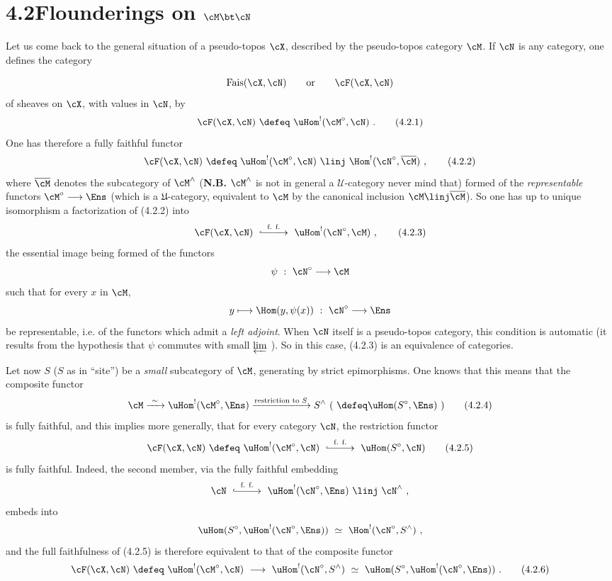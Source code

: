\section*{4.2\quad Flounderings on $\cM \bt \cN$}

Let us come back to the general situation of a pseudo-topos $\cX$, described by the pseudo-topos category $\cM$. If $\cN$ is any category, one defines the category

\[
\mathrm{Fais}(\cX,\cN) \qquad \text{or} \qquad \cF(\cX,\cN)
\]
of sheaves on $\cX$, with values in $\cN$, by
\[
\cF(\cX,\cN) \ \defeq\ \uHom^{!}(\cM^{\circ},\cN) \ .
\tag*{(4.2.1)}
\]
One has therefore a fully faithful functor
\[
\cF(\cX,\cN) \ \defeq\ \uHom^{!}(\cM^{\circ},\cN) \ \linj\ \Hom^{!}(\cN^{\circ},\overline{\cM}) \ ,
\tag*{(4.2.2)}
\]
where $\overline{\cM}$ denotes the subcategory of $\cM^{\wedge}$ (\textbf{N.B.} $\cM^{\wedge}$ is not in general a $\mathcal{U}$-category never mind that) formed of the \textit{representable} functors $\cM^{\circ}\longrightarrow\Ens$ (which is a $\mathfrak{U}$-category, equivalent to $\cM$ by the canonical inclusion $\cM \linj \overline{\cM}$). So one has up to unique isomorphism a factorization of (4.2.2) into
\[
\cF(\cX,\cN) \ \overset{\text{f. f.}}{\lhook\joinrel\relbar\joinrel\relbar\joinrel\longrightarrow}\ \uHom^{!}(\cN^{\circ},\cM) \ ,
\tag*{(4.2.3)}
\]
the essential image being formed of the functors
\[
\psi \ :\ \cN^{\circ} \longrightarrow \cM
\]
such that for every $x$ in $\cM$,
\[
y \longmapsto \Hom(y,\psi(x)) \ :\ \cN^{\circ} \longrightarrow \Ens
\]
be representable, i.e. of the functors which
admit a \textit{left adjoint}. When $\cN$ itself is a pseudo-topos category, this condition is automatic (it results from the hypothesis that $\psi$ commutes with small $\varprojlim$ ). So in this case, (4.2.3) is an equivalence of categories.

Let now $S$ ($S$ as in ``site'') be a \textit{small} subcategory of $\cM$, generating by strict epimorphisms. One knows that this means that the composite functor
\[
\cM \xrightarrow{\ \sim\ } \uHom^{!}(\cM^{\circ},\Ens) \xrightarrow{\text{restriction to } S} S^{\wedge} \ (\ \defeq \uHom(S^{\circ},\Ens)\ )
\tag*{(4.2.4)}
\]
is fully faithful, and this implies more generally, that for every category $\cN$, the restriction functor
\[
\cF(\cX,\cN) \ \defeq\ \uHom^{!}(\cM^{\circ},\cN) \ \overset{\text{f. f.}}{\lhook\joinrel\relbar\joinrel\relbar\joinrel\longrightarrow}\ \uHom(S^{\circ},\cN)
\tag*{(4.2.5)}
\]
is fully faithful. Indeed, the second member, via the fully faithful embedding
\[
\cN \ \overset{\text{f. f.}}{\lhook\joinrel\relbar\joinrel\relbar\joinrel\longrightarrow}\ \uHom^{!}(\cN^{\circ},\Ens) \ \linj\ \cN^{\wedge} \ ,
\]
embeds into
\[
\uHom(S^{\circ},\uHom^{!}(\cN^{\circ},\Ens)) \ \simeq\ \Hom^{!}(\cN^{\circ},S^{\wedge}) \ ,
\]
and the full faithfulness of (4.2.5) is therefore equivalent to that of the composite functor
\[
\cF(\cX,\cN) \ \defeq\ \uHom^{!}(\cM^{\circ},\cN) \ \longrightarrow\ \uHom^{!}(\cN^{\circ},S^{\wedge}) \ \simeq\ \uHom(S^{\circ},\uHom^{!}(\cN^{\circ},\Ens)) \ .
\tag*{(4.2.6)}
\]

